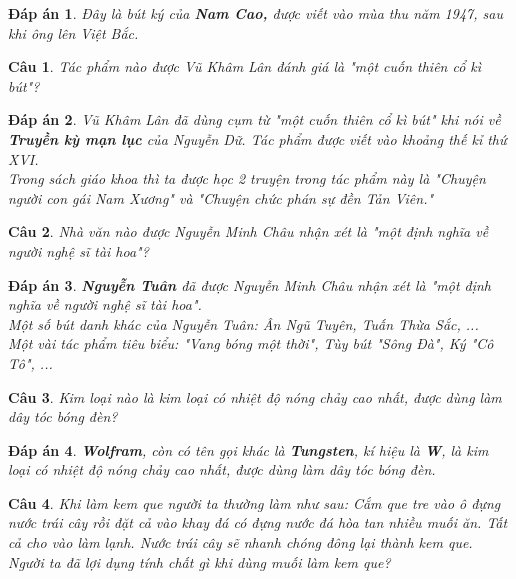 \documentclass[12pt,a4paper]{article}
\newtheorem{ques}{Câu}
\theoremstyle{nonumberplain}
\newtheorem{ans}{Đáp án}
\begin{document}
\begin{mybox} \begin{ans}
Đây là bút ký của \textbf{Nam Cao,} được viết vào mùa thu năm 1947, sau khi ông lên Việt Bắc.
\end{ans} \end{mybox}
\begin{ques}
Tác phẩm nào được Vũ Khâm Lân đánh giá là \textit{"một cuốn thiên cổ kì bút"}?
\end{ques}
\begin{mybox} \begin{ans}
Vũ Khâm Lân đã dùng cụm từ \textit{"một cuốn thiên cổ kì bút"} khi nói về \textbf{Truyền kỳ mạn lục} của Nguyễn Dữ. Tác phẩm được viết vào khoảng thế kỉ thứ XVI. \\
Trong sách giáo khoa thì ta được học 2 truyện trong tác phẩm này là \textit{"Chuyện người con gái Nam Xương"} và \textit{"Chuyện chức phán sự đền Tản Viên."}
\end{ans} \end{mybox}
\begin{ques}
Nhà văn nào được Nguyễn Minh Châu nhận xét là \textit{"một định nghĩa về người nghệ sĩ tài hoa"}?
\end{ques}
\begin{mybox} \begin{ans}
\textbf{Nguyễn Tuân} đã được Nguyễn Minh Châu nhận xét là \textit{"một định nghĩa về người nghệ sĩ tài hoa"}.\\
Một số bút danh khác của Nguyễn Tuân: Ân Ngũ Tuyên, Tuấn Thừa Sắc, ...\\
Một vài tác phẩm tiêu biểu: \textit{"Vang bóng một thời"}, Tùy bút \textit{"Sông Đà"}, Ký \textit{"Cô Tô"}, ...
\end{ans} \end{mybox}
\begin{ques}
Kim loại nào là kim loại có nhiệt độ nóng chảy cao nhất, được dùng làm dây tóc bóng đèn?
\end{ques}
\begin{mybox} \begin{ans}
\textbf{Wolfram}, còn có tên gọi khác là \textbf{Tungsten}, kí hiệu là \textbf{W}, là kim loại có nhiệt độ nóng chảy cao nhất, được dùng làm dây tóc bóng đèn.
\end{ans} \end{mybox}
\begin{ques}
Khi làm kem que người ta thường làm như sau: Cắm que tre vào ô đựng nước trái cây rồi đặt cả vào khay đá có đựng nước đá hòa tan nhiều muối ăn. Tất cả cho vào làm lạnh. Nước trái cây sẽ nhanh chóng đông lại thành kem que. Người ta đã lợi dụng tính chất gì khi dùng muối làm kem que?
\end{ques}
\end{document}
